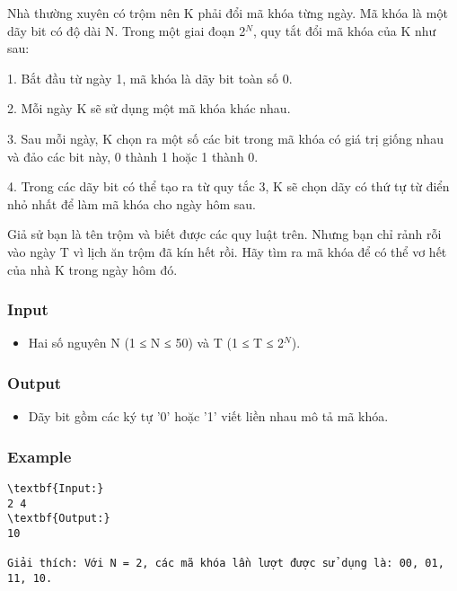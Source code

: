 

Nhà thường xuyên có trộm nên K phải đổi mã khóa từng ngày. Mã khóa là một dãy bit có độ dài N. Trong một giai đoạn 2$^N$, quy tắt đổi mã khóa của K như sau:

1. Bắt đầu từ ngày 1, mã khóa là dãy bit toàn số 0.

2. Mỗi ngày K sẽ sử dụng một mã khóa khác nhau.

3. Sau mỗi ngày, K chọn ra một số các bit trong mã khóa có giá trị giống nhau và đảo các bit này, 0 thành 1 hoặc 1 thành 0.

4. Trong các dãy bit có thể tạo ra từ quy tắc 3, K sẽ chọn dãy có thứ tự từ điển nhỏ nhất để làm mã khóa cho ngày hôm sau.

Giả sử bạn là tên trộm và biết được các quy luật trên. Nhưng bạn chỉ rảnh rỗi vào ngày T vì lịch ăn trộm đã kín hết rồi. Hãy tìm ra mã khóa để có thể vơ hết của nhà K trong ngày hôm đó.

\subsubsection{Input}
\begin{itemize}
	\item Hai số nguyên N (1 ≤ N ≤ 50) và T (1 ≤ T ≤ 2$^N$).
\end{itemize}

\subsubsection{Output}
\begin{itemize}
	\item Dãy bit gồm các ký tự '0' hoặc '1' viết liền nhau mô tả mã khóa. 
\end{itemize}

\subsubsection{Example}
\begin{verbatim}
\textbf{Input:}
2 4 
\textbf{Output:}
10

Giải thích: Với N = 2, các mã khóa lần lượt được sử dụng là: 00, 01, 11, 10. \end{verbatim}

